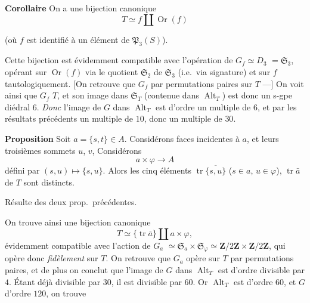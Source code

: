 \documentclass[11pt,a4paper]{article}
\begin{document}
\textbf{Corollaire} On a une bijection canonique
\[
  T \simeq f \amalg \operatorname{Or}(f)
\]


(où $f$ est identifié à un élément de $\mathfrak{P}_3(S)$).

Cette bijection est évidemment compatible avec l'opération de $G_f \simeq
D_3$ $= \mathfrak{S}_3$, opérant sur \struck{\ill{}} $\operatorname{Or}(f)$ via le
quotient $\mathfrak{S}_2$ de $\mathfrak{S}_3$ (i.e.\ via signature) et sur
$f$ tautologiquement.  [On retrouve que $G_f$
  par permutations paires sur $T$ ---] On voit
ainsi que  $G_f$   $T$, et son image dans $\mathfrak{S}_T$ (contenue dans
$\operatorname{Alt}_T$) est donc un s-gpe diédral $6$.
\emph{Donc} l'image de $G$ dans $\operatorname{Alt}_T$ est d'ordre un
multiple de $6$, et par les résultats précédents un multiple de $10$, donc
un multiple de $30$.

\textbf{Proposition} Soit $a = \{s, t\} \in A$. Considérons
  faces incidentes à $a$, et
  leurs
troisièmes sommets $u$, $v$,  Considérons
\[
  a \times \varphi \longrightarrow A
\]
défini par $(s, u) \longmapsto \{s, u\}$. Alors les cinq éléments
$\operatorname{tr}\overline{\{s, u\}}$ ($s \in a$, $u \in \varphi$),
$\operatorname{tr}\bar{a}$ de $T$ sont distincts.

Résulte des deux prop.\ précédentes.


On trouve ainsi une bijection canonique
\[
  T \simeq \{\operatorname{tr}\bar{a}\} \amalg a \times \varphi ,
\]
évidemment compatible avec l'action de $G_a$ $\simeq \mathfrak{S}_a \times
\mathfrak{S}_\varphi \simeq \mathbf{Z}/2\mathbf{Z} \times
\mathbf{Z}/2\mathbf{Z}$, qui opère donc \emph{fidèlement} sur $T$. On
retrouve que $G_a$ opère sur $T$ par permutations paires, et  de plus on
conclut que l'image de $G$ dans $\operatorname{Alt}_T$ est d'ordre
divisible par $4$. Étant déjà  divisible par $30$, il est
divisible par $60$. Or $\operatorname{Alt}_T$ est d'ordre $60$,
 et  $G$ d'ordre $120$, on trouve
\end{document}
